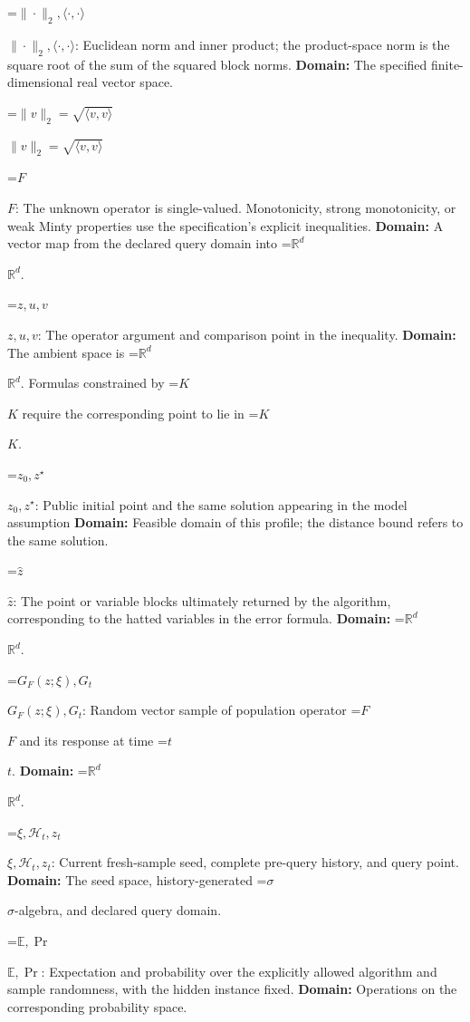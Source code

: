 \documentclass[10pt,a4paper]{article}
\newcommand{\AtlasMath}[1]{\par\begingroup\centering\setbox0=\hbox{$\displaystyle #1$}\ifdim\wd0>1.4\linewidth\typeout{ATLAS WIDE FORMULA: \the\wd0}\fi\ifdim\wd0>\linewidth\resizebox{\linewidth}{!}{\box0}\else\box0\fi\par\endgroup}
\newcommand{\AtlasInlineMath}[1]{\begingroup\setbox0=\hbox{$#1$}\ifdim\wd0>.4\linewidth\endgroup\AtlasMath{#1}\else\endgroup$#1$\fi}
\begin{document}
\AtlasInlineMath{\|\cdot\|_2,\langle\cdot,\cdot\rangle}: Euclidean norm and inner product; the product-space norm is the square root of the sum of the squared block norms. \textbf{Domain:} The specified finite-dimensional real vector space.



\AtlasInlineMath{\|v\|_2=\sqrt{\langle v,v\rangle}}



\AtlasInlineMath{F}: The unknown operator is single-valued. Monotonicity, strong monotonicity, or weak Minty properties use the specification’s explicit inequalities. \textbf{Domain:} A vector map from the declared query domain into \AtlasInlineMath{\mathbb R^d}.



\AtlasInlineMath{z,u,v}: The operator argument and comparison point in the inequality. \textbf{Domain:} The ambient space is \AtlasInlineMath{\mathbb R^d}. Formulas constrained by \AtlasInlineMath{K} require the corresponding point to lie in \AtlasInlineMath{K}.



\AtlasInlineMath{z_0,z^\star}: Public initial point and the same solution appearing in the model assumption \textbf{Domain:} Feasible domain of this profile; the distance bound refers to the same solution.



\AtlasInlineMath{\widehat z}: The point or variable blocks ultimately returned by the algorithm, corresponding to the hatted variables in the error formula. \textbf{Domain:} \AtlasInlineMath{\mathbb R^d}.



\AtlasInlineMath{G_F(z;\xi),G_t}: Random vector sample of population operator \AtlasInlineMath{F} and its response at time \AtlasInlineMath{t}. \textbf{Domain:} \AtlasInlineMath{\mathbb R^d}.



\AtlasInlineMath{\xi,\mathcal H_t,z_t}: Current fresh-sample seed, complete pre-query history, and query point. \textbf{Domain:} The seed space, history-generated \AtlasInlineMath{\sigma}-algebra, and declared query domain.



\AtlasInlineMath{\mathbb E,\Pr}: Expectation and probability over the explicitly allowed algorithm and sample randomness, with the hidden instance fixed. \textbf{Domain:} Operations on the corresponding probability space.
\end{document}
